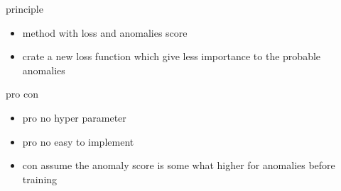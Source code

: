 \documentclass[../description.tex]{subfiles}
\begin{document}
    \item principle
    \begin{itemize}
        \item method with loss and anomalies score
        \item crate a new loss function which give less importance to the probable anomalies
    \end{itemize}
    \item  pro con 
    \begin{itemize}
        \item pro no hyper parameter
        \item pro no easy to implement
        \item con assume the anomaly score is some what higher for anomalies before training
    \end{itemize}
\end{document}
